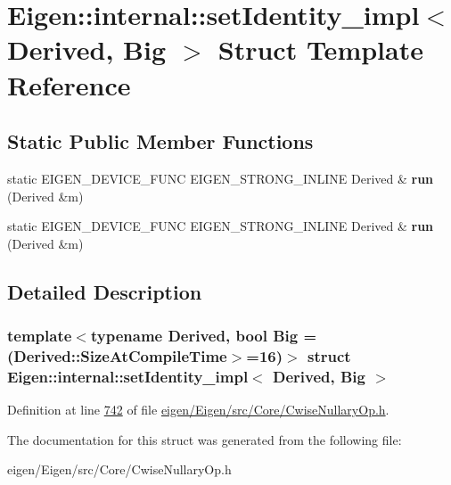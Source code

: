 \hypertarget{struct_eigen_1_1internal_1_1set_identity__impl}{}\section{Eigen\+:\+:internal\+:\+:set\+Identity\+\_\+impl$<$ Derived, Big $>$ Struct Template Reference}
\label{struct_eigen_1_1internal_1_1set_identity__impl}
\subsection*{Static Public Member Functions}
\begin{DoxyCompactItemize}
\item 
\mbox{\label{struct_eigen_1_1internal_1_1set_identity__impl_a1258fcb8a505a55e4e0b54077011f9e5}} 
static E\+I\+G\+E\+N\+\_\+\+D\+E\+V\+I\+C\+E\+\_\+\+F\+U\+NC E\+I\+G\+E\+N\+\_\+\+S\+T\+R\+O\+N\+G\+\_\+\+I\+N\+L\+I\+NE Derived \& {\bfseries run} (Derived \&m)
\item 
\mbox{\label{struct_eigen_1_1internal_1_1set_identity__impl_a1258fcb8a505a55e4e0b54077011f9e5}} 
static E\+I\+G\+E\+N\+\_\+\+D\+E\+V\+I\+C\+E\+\_\+\+F\+U\+NC E\+I\+G\+E\+N\+\_\+\+S\+T\+R\+O\+N\+G\+\_\+\+I\+N\+L\+I\+NE Derived \& {\bfseries run} (Derived \&m)
\end{DoxyCompactItemize}


\subsection{Detailed Description}
\subsubsection*{template$<$typename Derived, bool Big = (\+Derived\+::\+Size\+At\+Compile\+Time$>$=16)$>$\newline
struct Eigen\+::internal\+::set\+Identity\+\_\+impl$<$ Derived, Big $>$}



Definition at line \hyperlink{eigen_2_eigen_2src_2_core_2_cwise_nullary_op_8h_source_l00742}{742} of file \hyperlink{eigen_2_eigen_2src_2_core_2_cwise_nullary_op_8h_source}{eigen/\+Eigen/src/\+Core/\+Cwise\+Nullary\+Op.\+h}.



The documentation for this struct was generated from the following file\+:\begin{DoxyCompactItemize}
\item 
eigen/\+Eigen/src/\+Core/\+Cwise\+Nullary\+Op.\+h\end{DoxyCompactItemize}
